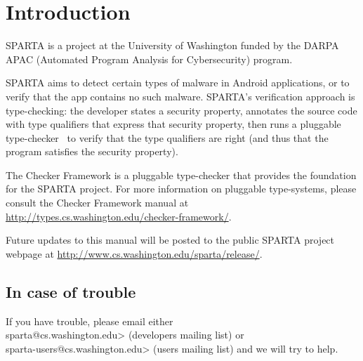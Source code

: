 \htmlhr
\chapter{Introduction\label{introduction}}

SPARTA is a project at the University of Washington funded by the DARPA
APAC (Automated Program Analysis for Cybersecurity) program.


SPARTA aims to detect certain types of malware in Android applications, or
to verify that the app contains no such malware.  SPARTA's verification
approach is type-checking:  the developer states a security property,
annotates the source code with type qualifiers that express that security
property, then runs a pluggable type-checker~\cite{PapiACPE2008,DietlDEMS2011} to verify that the type
qualifiers are right (and thus that the program satisfies the security
property).


The Checker Framework is a pluggable type-checker that provides the foundation for the SPARTA project. 
For more information on pluggable type-systems, please consult the Checker Framework manual at 
\url{http://types.cs.washington.edu/checker-framework/}.  


Future updates to this manual will be posted to the public SPARTA project webpage at
\url{http://www.cs.washington.edu/sparta/release/}.

\section{In case of trouble}

If you have trouble, please email either\\
\<sparta@cs.washington.edu>
(developers mailing list) or\\
\<sparta-users@cs.washington.edu> (users
mailing list) and we will try to help.





